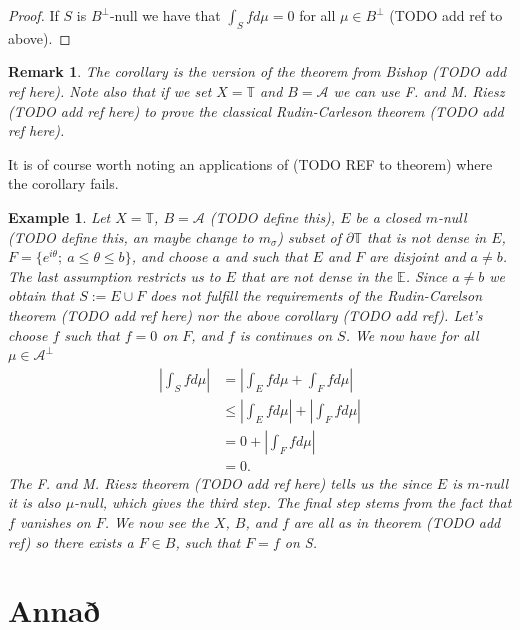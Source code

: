 \documentclass[a4paper,12pt,twoside,BCOR=10mm]{scrbook}
\newtheorem{remark}{Remark}
\newtheorem{example}{Example}
\begin{document}
\begin{proof}
If $S$ is $B^{\bot}$-null we have that $\int_S f d\mu = 0$ for all $\mu \in B^{\bot}$ (TODO add ref to above).
\end{proof}
\begin{remark}
The corollary is the version of the theorem from Bishop (TODO add ref here).
Note also that if we set $X = \mathbb{T}$ and $B = \mathcal{A}$ we can use F. and M. Riesz (TODO add ref here) to prove the classical Rudin-Carleson theorem (TODO add ref here).
\end{remark}
It is of course worth noting an applications of (TODO REF to theorem) where the corollary fails.
\begin{example}
Let $X = \mathbb{T}$,
	$B = \mathcal{A}$ (TODO define this),
	$E$ be a closed $m$-null (TODO define this, an maybe change to $m_{\sigma}$) subset of $\partial \mathbb{T}$ that is not dense in $E$,
	$F = \{ e^{i\theta};\ a \leq \theta \leq b \}$,
	and choose $a$ and such that $E$ and $F$ are disjoint and $a \neq b$.
The last assumption restricts us to $E$ that are not dense in the $\mathbb{E}$.
Since $a \neq b$ we obtain that $S := E \cup F$ does not fulfill the requirements of the Rudin-Carelson theorem (TODO add ref here) nor the above corollary (TODO add ref).
Let's choose $f$ such that $f = 0$ on $F$, and $f$ is continues on $S$.
We now have for all $\mu \in \mathcal{A}^{\bot}$
\begin{align*}
	\left | \int_S f d\mu \right |
	&= \left |\int_E f d\mu + \int_F f d\mu \right |\\
	&\leq \left |\int_E f d\mu \right | + \left | \int_F f d\mu \right |\\
	&= 0 + \left | \int_F f d\mu \right |\\
	&= 0.
\end{align*}
The F. and M. Riesz theorem (TODO add ref here) tells us the since $E$ is $m$-null it is also $\mu$-null, which gives the third step.
The final step stems from the fact that $f$ vanishes on $F$.
We now see the $X$, $B$, and $f$ are all as in theorem (TODO add ref) so there exists a $F \in B$, such that $F = f$ on S.
\end{example}

\appendix
\renewcommand{\chaptername}{Appendix}
\chapter{Annað}
\end{document}
